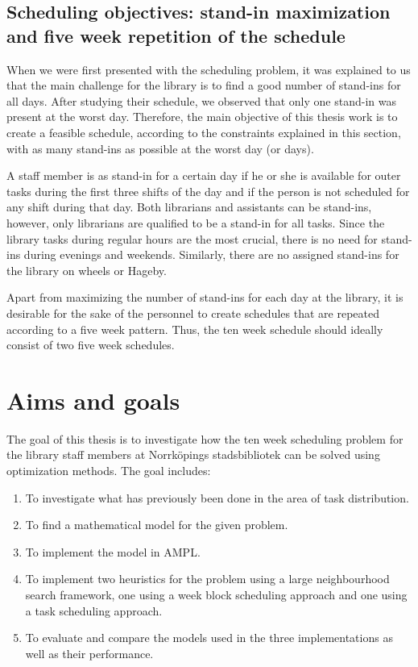 \subsection{Scheduling objectives: stand-in maximization and five week repetition of the schedule}

When we were first presented with the scheduling problem, it was explained to us that the main challenge for the library is to find a good number of stand-ins for all days. After studying their schedule, we observed that only one stand-in was present at the worst day. Therefore, the main objective of this thesis work is to create a feasible schedule, according to the constraints explained in this section, with as many stand-ins as possible at the worst day (or days).

A staff member is as stand-in for a certain day if he or she is available for outer tasks during the first three shifts of the day and if the person is not scheduled for any shift during that day. Both librarians and assistants can be stand-ins, however, only librarians are qualified to be a stand-in for all tasks. Since the library tasks during regular hours are the most crucial, there is no need for stand-ins during evenings and weekends. Similarly, there are no assigned stand-ins for the library on wheels or Hageby.

Apart from maximizing the number of stand-ins for each day at the library, it is desirable for the sake of the personnel to create schedules that are repeated according to a five week pattern. Thus, the ten week schedule should ideally consist of two five week schedules.

\section{Aims and goals}

The goal of this thesis is to investigate how the ten week scheduling problem for the library staff members at Norrköpings stadsbibliotek can be solved using optimization methods. The goal includes:

\begin{enumerate}
\item To investigate what has previously been done in the area of task distribution.
\item To find a mathematical model for the given problem.
\item To implement the model in AMPL.
\item To implement two heuristics for the problem using a large neighbourhood search framework, one using a week block scheduling approach and one using a task scheduling approach.
\item To evaluate and compare the models used in the three implementations as well as their performance.
\end{enumerate}


